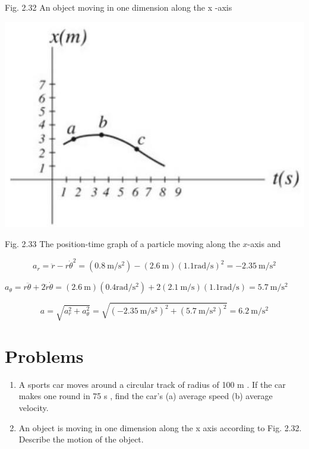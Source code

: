 \documentclass[10pt]{article}
\begin{document}
Fig. 2.32 An object moving in one dimension along the x -axis

\begin{center}
\includegraphics[max width=\textwidth]{2024_09_13_db1f357d2aad0a03eb2eg-044}
\end{center}

Fig. 2.33 The position-time graph of a particle moving along the $x$-axis and

$$
a_{r}=\ddot{r}-r \dot{\theta}^{2}=\left(0.8 \mathrm{~m} / \mathrm{s}^{2}\right)-(2.6 \mathrm{~m})(1.1 \mathrm{rad} / \mathrm{s})^{2}=-2.35 \mathrm{~m} / \mathrm{s}^{2}
$$

$a_{\theta}=r \ddot{\theta}+2 \dot{r} \dot{\theta}=(2.6 \mathrm{~m})\left(0.4 \mathrm{rad} / \mathrm{s}^{2}\right)+2(2.1 \mathrm{~m} / \mathrm{s})(1.1 \mathrm{rad} / \mathrm{s})=5.7 \mathrm{~m} / \mathrm{s}^{2}$

$$
a=\sqrt{a_{r}^{2}+a_{\theta}^{2}}=\sqrt{\left(-2.35 \mathrm{~m} / \mathrm{s}^{2}\right)^{2}+\left(5.7 \mathrm{~m} / \mathrm{s}^{2}\right)^{2}}=6.2 \mathrm{~m} / \mathrm{s}^{2}
$$

\section*{Problems}
\begin{enumerate}
  \item A sports car moves around a circular track of radius of 100 m . If the car makes one round in 75 s , find the car's (a) average speed (b) average velocity.
  \item An object is moving in one dimension along the x axis according to Fig. 2.32. Describe the motion of the object.
\end{enumerate}
\end{document}
